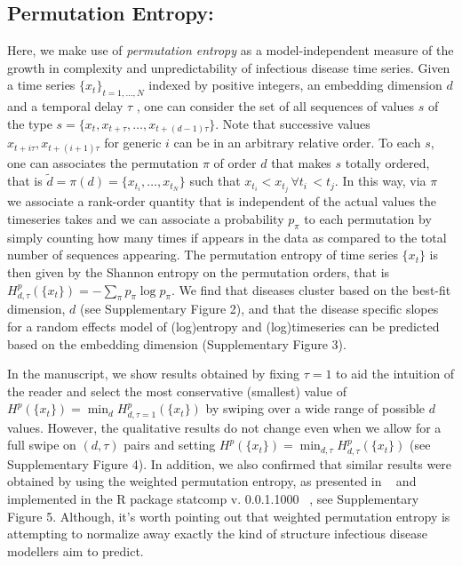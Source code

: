 \documentclass[fleqn,12pt]{wlscirep}
\begin{document}
\subsection*{Permutation Entropy:} 
Here, we make use of \emph{permutation entropy} as a model-independent measure of the growth in complexity and unpredictability of infectious disease time series. Given a time series $\{x_ t \}_{t =1, \ldots, N}$ indexed by positive integers, an embedding dimension $d$ and a temporal delay $\tau$ , one can consider the set of all sequences of values  $s$ of the type  $s = \{ x_t, x_{t+\tau}, \ldots, x_{t+ (d-1)\tau} \}$. Note that successive values $x_{t+ i\tau}, x_{t+(i+1)\tau}$ for generic $i$ can be in an arbitrary relative order.  To each $s$, one can associates the permutation $\pi$  of order $d$ that makes $s$ totally ordered, that is $\tilde{d} = \pi(d) = \{ x_{t_i}, \ldots,x_{t_N} \}$ such that $x_{t_i} < x_{t_j} \, \forall t_i \, < t_j$. In this way, via $\pi$  we associate a rank-order quantity that is independent of the actual values the timeseries takes and we can associate a probability $p_\pi$ to each permutation by simply counting how many times if appears in the data as compared to the total number of sequences appearing.  The permutation entropy of time series $\{x_t\}$ is then given by the Shannon entropy on the permutation orders, that is $H^p_{d,\tau} (\{ x_t\}) = - \sum_\pi p_\pi \log p_\pi$. We find that diseases cluster based on the best-fit dimension, $d$ (see Supplementary Figure 2), and that the disease specific slopes for a random effects model of (log)entropy and (log)timeseries can be predicted based on the embedding dimension (Supplementary Figure 3).

In the manuscript, we show results obtained by fixing $\tau=1$ to aid the intuition of the reader and select the most conservative (smallest) value of $H^p(\{ x_t\}) = \min_{d} H^p_{d,\tau=1}(\{ x_t\})$ by swiping over a wide range of possible $d$ values. However, the qualitative results do not change even when we allow for a full swipe on $(d,\tau)$ pairs and setting $H^p (\{ x_t\}) = \min_{d,\tau} H^p_{d,\tau}(\{ x_t\})$ (see Supplementary Figure 4). In addition, we also confirmed that similar results were obtained by using the weighted permutation entropy, as presented in ~\cite{fadlallah2013weighted,garland2014model} and implemented in the R package statcomp v. 0.0.1.1000 ~\cite{statcomp}, see Supplementary Figure 5.  Although, it's worth pointing out that weighted permutation entropy is attempting to normalize away exactly the kind of structure infectious disease modellers aim to predict.
\end{document}
